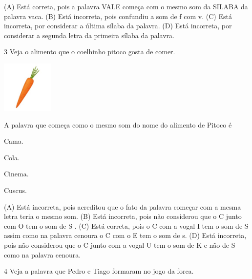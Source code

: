 (A) Está correta, pois a palavra VALE começa com o mesmo som da SILABA da palavra vaca.
(B) Está incorreta, pois confundiu a som de f com v.
(C) Está incorreta, por considerar a última sílaba da palavra.
(D) Está incorreta, por considerar a segunda letra da primeira sílaba da palavra.

\num{3} Veja o alimento que o coelhinho pitoco gosta de comer.

\includegraphics[width=1.01111in,height=1.01111in]{media/image149.jpeg}


A palavra que começa como o mesmo som do nome do alimento de Pitoco é

\begin{minipage}{.5\textwidth}
\begin{escolha}
\item Cama.

\item Cola.

\item Cinema.

\item Cuscus.
\end{escolha}
\end{minipage}

(A) Está incorreta, pois acreditou que o fato da palavra começar com a mesma letra teria o mesmo som.
(B) Está incorreta, pois não considerou que o C junto com O tem o som de S .
(C) Está correta, pois o C com a vogal I tem o som de S assim como na
palavra cenoura o C com o E tem o som de s.
(D) Está incorreta, pois não considerou que o C junto com a vogal U tem
o som de K e não de S como na palavra cenoura.

\num{4} Veja a palavra que Pedro e Tiago formaram no jogo da forca.

